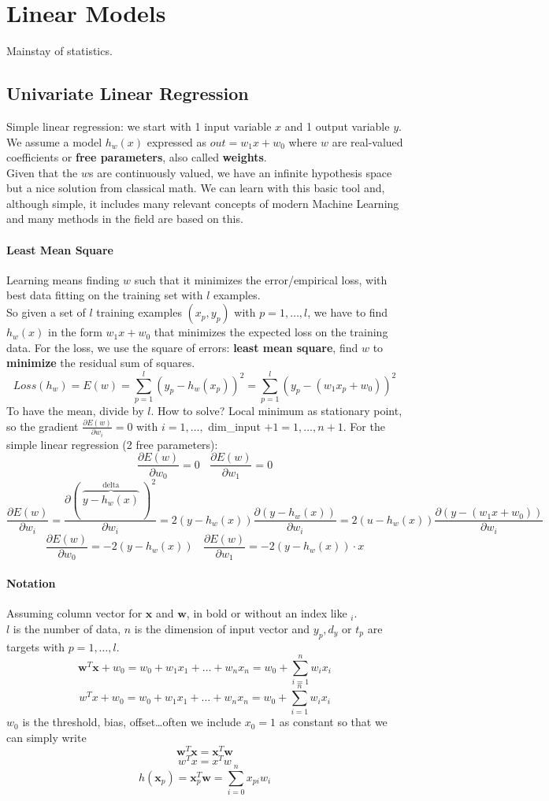 \documentclass[10pt]{report}
\begin{document}
\section{Linear Models} Mainstay of statistics.
\subsection{Univariate Linear Regression} Simple linear regression: we start with 1 input variable $x$ and 1 output variable $y$. We assume a model $h_w(x)$ expressed as $out = w_1x + w_0$ where $w$ are real-valued coefficients or \textbf{free parameters}, also called \textbf{weights}.\\
Given that the $w$s are continuously valued, we have an infinite hypothesis space but a nice solution from classical math. We can learn with this basic tool and, although simple, it includes many relevant concepts of modern Machine Learning and many methods in the field are based on this.
\paragraph{Least Mean Square} Learning means finding $w$ such that it minimizes the error/empirical loss, with best data fitting on the training set with $l$ examples.\\
So given a set of $l$ training examples $(x_p, y_p)$ with $p = 1,\ldots,l$, we have to find $h_w(x)$ in the form $w_1x + w_0$ that minimizes the expected loss on the training data. For the loss, we use the square of errors: \textbf{least mean square}, find $w$ to \textbf{minimize} the residual sum of squares.
$$Loss(h_w) = E(w) = \sum_{p=1}^l (y_p - h_w(x_p))^2 = \sum_{p=1}^l (y_p - (w_1x_p + w_0))^2$$
To have the mean, divide by $l$. How to solve? Local minimum as stationary point, so the gradient $\frac{\partial E(w)}{\partial w_i} = 0$ with $i = 1,\ldots,$ dim\_input $+1 = 1,\ldots, n+1$. For the simple linear regression (2 free parameters):
$$\frac{\partial E(w)}{\partial w_0} = 0\:\:\:\:\frac{\partial E(w)}{\partial w_1} = 0$$
$$\frac{\partial E(w)}{\partial w_i} = \frac{\partial(\:\overset{\text{delta}}{\overbrace{y-h_w(x)}}\:)^2}{\partial w_i} = 2(y-h_w(x))\frac{\partial(y-h_w(x))}{\partial w_i}=2(u-h_w(x))\frac{\partial (y-(w_1x+w_0))}{\partial w_i}$$
$$\frac{\partial E(w)}{\partial w_0} = -2(y - h_w(x))\:\:\:\:\frac{\partial E(w)}{\partial w_1} = -2(y - h_w(x))\cdot x$$
\paragraph{Notation} Assuming column vector for $\mathbf{x}$ and $\mathbf{w}$, in bold or without an index like $_i$.\\
$l$ is the number of data, $n$ is the dimension of input vector and $y_p,d_y$ or $t_p$ are targets with $p=1,\ldots,l$.
$$\mathbf{w}^T\mathbf{x} + w_0 = w_0 + w_1x_1+\ldots + w_nx_n = w_0 + \sum_{i=1}^n w_ix_i$$
$$w^Tx + w_0 = w_0 + w_1x_1+\ldots + w_nx_n = w_0 + \sum_{i=1}^n w_ix_i$$
$w_0$ is the threshold, bias, offset\ldots often we include $x_0=1$ as constant so that we can simply write $$\mathbf{w}^T\mathbf{x} = \mathbf{x}^T\mathbf{w}$$
$$w^Tx=x^Tw$$
$$h(\mathbf{x}_p)=\mathbf{x}_p^T\mathbf{w}=\sum_{i=0}^nx_{pi}w_i$$
\end{document}

